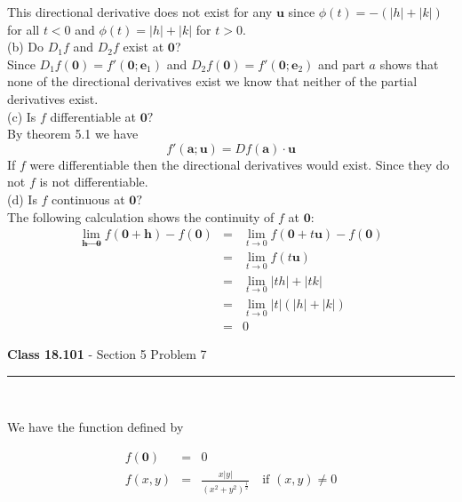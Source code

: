 \documentclass[11pt,reqno]{article}
\begin{document}
This directional derivative does not exist for any $\textbf{u}$ since $\phi(t) = -(|h| + |k|)$ for all $t < 0$ and $\phi(t) = |h| + |k|$ for $t > 0$.\\

\noindent (b) Do $D_1 f$ and $D_2 f$ exist at $\textbf{0}$?\\

Since $D_1 f(\textbf{0}) = f'(\textbf{0}; \textbf{e}_1)$ and $D_2 f(\textbf{0}) = f'(\textbf{0}; \textbf{e}_2)$ and part $a$ shows that none of the directional derivatives exist we know that neither of the partial derivatives exist.\\

\noindent (c) Is $f$ differentiable at $\textbf{0}?$\\

By theorem 5.1 we have
\[ f'(\textbf{a};\textbf{u}) = Df(\textbf{a}) \cdot \textbf{u} \]
If $f$ were differentiable then the directional derivatives would exist. Since they do not $f$ is not differentiable.\\

\noindent (d) Is $f$ continuous at $\textbf{0}?$\\

\noindent  The following calculation shows the continuity of $f$ at $\textbf{0}$:
\begin{eqnarray*}
\lim_{\textbf{h} \to \textbf{0}} f(\textbf{0} + \textbf{h}) - f(\textbf{0}) &=& \lim_{t \to 0} f(\textbf{0} + t \textbf{u}) - f(\textbf{0})\\
&=& \lim_{t \to 0} f(t \textbf{u})\\
&=& \lim_{t \to 0} |t h| + |t k| \\
&=& \lim_{t \to 0} |t| (|h| + |k|) \\
&=& 0
\end{eqnarray*}

\vspace{15pt}
\begin{flushleft} 
\textbf{Class 18.101} - Section 5 Problem 7\\
\rule{500pt}{1pt}\\
\end{flushleft} 

\noindent We have the function defined by

\begin{eqnarray*} 
f(\textbf{0}) &=& 0 \\
f(x,y) &=& \frac{x |y|}{(x^2 + y^2)^\frac{1}{2}} \quad \text{if $(x,y) \neq 0$} \\
\end{eqnarray*}
\end{document}
